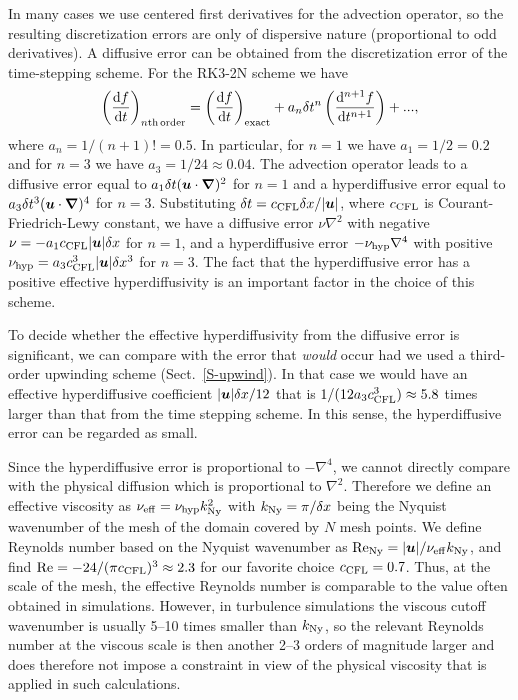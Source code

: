 \documentclass[\mydriver,12pt,twoside,notitlepage,a4paper]{article}
\renewcommand{\vec}[1]{\mbox{\boldmath{$#1$}}}
\newcommand{\uv}            {\vec{u}}
\newcommand{\nab}{\mbox{\boldmath $\nabla$} {}}
\newcommand{\dd}{{\rm d} {}}
\begin{document}
In many cases we use centered first derivatives for the advection
operator, so the resulting discretization errors are only of
dispersive nature (proportional to odd derivatives).
A diffusive error can be obtained from the discretization error
of the time-stepping scheme.
For the RK3-2N scheme we have
\begin{equation}
\left({\dd f\over\dd t}\right)_{n\rm th\,order}
=\left({\dd f\over\dd t}\right)_{\rm exact}
+a_n\delta t^n\left({\dd^{n+1} f\over\dd t^{n+1}}\right)+...,
\end{equation}
where $a_n=1/(n+1)!=0.5$.
In particular, for $n=1$ we have $a_1=1/2=0.2$ and
for $n=3$ we have $a_3=1/24\approx0.04$.
The advection operator leads to a diffusive error equal to
$a_1\delta t(\uv\cdot\nab)^2$ for $n=1$ and a
hyperdiffusive error equal to
$a_3\delta t^3(\uv\cdot\nab)^4$ for $n=3$.
Substituting $\delta t=c_{\rm CFL}\delta x/|\uv|$,
where $c_{\rm CFL}$ is Courant-Friedrich-Lewy constant,
we have a diffusive error $\nu\nabla^2$ with negative
$\nu=-a_1 c_{\rm CFL}|\uv|\delta x$ for $n=1$,
and a hyperdiffusive error $-\nu_{\rm hyp}\nabla^4$ with positive
$\nu_{\rm hyp}=a_3 c_{\rm CFL}^3 |\uv|\delta x^3$ for $n=3$.
The fact that the hyperdiffusive error has a positive effective
hyperdiffusivity is an important factor in the choice of this scheme.

To decide whether the effective hyperdiffusivity from the diffusive
error is significant, we can compare with the error that {\em would}
occur had we used a third-order upwinding scheme (Sect.~\ref{S-upwind}).
In that case we would have an effective hyperdiffusive coefficient
$|\uv|\delta x/12$ that is $1/(12a_3 c_{\rm CFL}^3)\approx5.8$ times
larger than that from the time stepping scheme.
In this sense, the hyperdiffusive error can be regarded as small.

Since the hyperdiffusive error is proportional to $-\nabla^4$,
we cannot directly compare with the physical diffusion which is
proportional to $\nabla^2$.
Therefore we define an effective viscosity as
$\nu_{\rm eff}=\nu_{\rm hyp}k_{\rm Ny}^2$ with $k_{\rm Ny}=\pi/\delta x$
being the Nyquist wavenumber of the mesh
of the domain covered by $N$ mesh points.
We define Reynolds number based on the Nyquist wavenumber as
$\mbox{Re}_{\rm Ny}=|\uv|/\nu_{\rm eff} k_{\rm Ny}$,
and find $\mbox{Re}=-24/(\pi c_{\rm CFL})^3\approx 2.3$
for our favorite choice $c_{\rm CFL}=0.7$.
Thus, at the scale of the mesh, the effective Reynolds number
is comparable to the value often obtained in simulations.
However, in turbulence simulations the viscous cutoff wavenumber
is usually 5--10 times smaller than $k_{\rm Ny}$, so the relevant
Reynolds number at the viscous scale is then another 2--3 orders
of magnitude larger and does therefore not impose a constraint
in view of the physical viscosity that is applied in such calculations.
\end{document}
